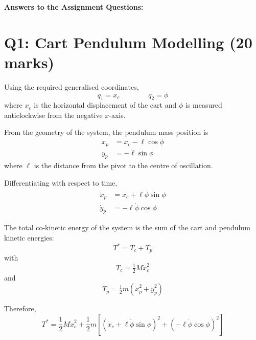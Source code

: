 \documentclass[11pt,a4paper]{article}
\begin{document}
\vspace{10pt}

\begin{center}\large\bfseries Answers to the Assignment Questions:\end{center}

\section*{Q1: Cart Pendulum Modelling \hfill (20 marks)}

Using the required generalised coordinates,
\begin{equation*}
	q_{1} = x_{c} \qquad\qquad q_{2} = \phi
\end{equation*}
where $x_{c}$ is the horizontal displacement of the cart and $\phi$ is measured
anticlockwise from the negative $x$-axis.

From the geometry of the system, the pendulum mass position is
\begin{align*}
	x_{p} &= x_{c} - \ell \cos\phi \\
	y_{p} &= -\ell \sin\phi
\end{align*}
where $\ell$ is the distance from the pivot to the centre of oscillation.

Differentiating with respect to time,
\begin{align*}
	\dot{x}_{p} &= \dot{x}_{c} + \ell\dot{\phi}\sin\phi \\
	\dot{y}_{p} &= -\ell\dot{\phi}\cos\phi
\end{align*}

The total co-kinetic energy of the system is the sum of the cart and pendulum
kinetic energies:
\begin{equation*}
	T^{*} = T_{c} + T_{p}
\end{equation*}
with
\begin{equation*}
	T_{c} = \tfrac{1}{2} M \dot{x}_{c}^{2}
\end{equation*}
and
\begin{equation*}
	T_{p} = \tfrac{1}{2} m \left( \dot{x}_{p}^{2} + \dot{y}_{p}^{2} \right)
\end{equation*}

Therefore,
\begin{equation*}
	T^{*} = \frac{1}{2} M \dot{x}_{c}^{2}
	+ \frac{1}{2} m \left[ \left( \dot{x}_{c} + \ell\dot{\phi}\sin\phi \right)^{2}
	+ \left( -\ell\dot{\phi}\cos\phi \right)^{2} \right]
\end{equation*}
\end{document}
